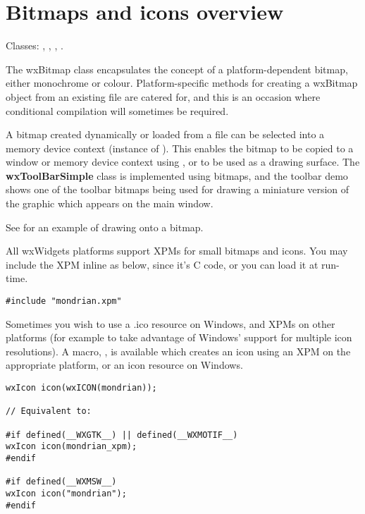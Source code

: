 \section{Bitmaps and icons overview}\label{wxbitmapoverview}

Classes: , , , .

The wxBitmap class encapsulates the concept of a platform-dependent bitmap,
either monochrome or colour. Platform-specific methods for creating a
wxBitmap object from an existing file are catered for, and
this is an occasion where conditional compilation will sometimes be
required.

A bitmap created dynamically or loaded from a file can be selected
into a memory device context (instance of ). This
enables the bitmap to be copied to a window or memory device context
using , or to be used as a drawing surface.  The {\bf
wxToolBarSimple} class is implemented using bitmaps, and the toolbar demo
shows one of the toolbar bitmaps being used for drawing a miniature
version of the graphic which appears on the main window.

See  for an example of drawing onto a bitmap.

All wxWidgets platforms support XPMs for small bitmaps and icons.
You may include the XPM inline as below, since it's C code, or you
can load it at run-time.

\begin{verbatim}
#include "mondrian.xpm"
\end{verbatim}

Sometimes you wish to use a .ico resource on Windows, and XPMs on
other platforms (for example to take advantage of Windows' support for multiple icon resolutions).
A macro, , is available which creates an icon using an XPM
on the appropriate platform, or an icon resource on Windows.

\begin{verbatim}
wxIcon icon(wxICON(mondrian));

// Equivalent to:

#if defined(__WXGTK__) || defined(__WXMOTIF__)
wxIcon icon(mondrian_xpm);
#endif

#if defined(__WXMSW__)
wxIcon icon("mondrian");
#endif
\end{verbatim}

